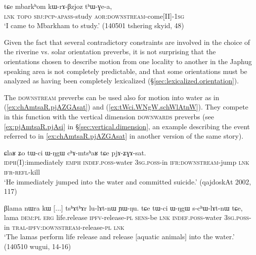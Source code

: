  \begin{exe}
\ex \label{ex:kWrABzjoz.thWGea}
\gll tɕe mbarkʰom kɯ-rɤ-βzjoz tʰɯ-ɣe-a, \\
\textsc{lnk}  \textsc{topo} \textsc{sbj}:\textsc{pcp}-\textsc{apass}-study \textsc{aor}:\textsc{downstream}-come[II]-\textsc{1sg} \\
\glt `I came to Mbarkham to study.' (140501 tshering skyid, 48)
\end{exe}
 
Given the fact that several contradictory constraints are involved in the choice of the riverine vs. solar orientation preverbs, it is not surprising that the orientations chosen to describe motion from one locality to another in the Japhug speaking area is not completely predictable, and that some orientations must be analyzed as having been completely lexicalized (§\ref{sec:lexicalized.orientation}).

The \textsc{downstream} preverbs can be used also for motion into water as in (\ref{ex:chAmtsaR.pjAZGAsat}) and (\ref{ex:tWci.WNgW.schWlAtnW}). They compete in this function with the vertical dimension \textsc{downwards} preverbs (see \ref{ex:pjAmtsaR.pjAsi} in §\ref{sec:vertical.dimension}, an example describing the event referred to in \ref{ex:chAmtsaR.pjAZGAsat} in another version of the same story).
 
 \begin{exe}
\ex \label{ex:chAmtsaR.pjAZGAsat}
\gll ɕlaʁ ʑo tɯ-ci ɯ-ŋgɯ cʰɤ-mtsʰaʁ tɕe pjɤ-ʑɣɤ-sat. \\
\textsc{idph}(I):immediately \textsc{emph} \textsc{indef}.\textsc{poss}-water \textsc{3sg}.\textsc{poss}-in \textsc{ifr}:\textsc{downstream}-jump \textsc{lnk} \textsc{ifr}-\textsc{refl}-kill \\
\glt `He immediately jumped into the water and committed suicide.' (qajdoskAt 2002, 117)
\end{exe}

\begin{exe}
\ex \label{ex:tWci.WNgW.schWlAtnW}
\gll  βlama nɯra kɯ [...] tsʰɤtʰɤr lu-lɤt-nɯ ɲɯ-ŋu.  tɕe tɯ-ci ɯ-ŋgɯ s-cʰɯ-lɤt-nɯ tɕe,  \\
 lama \textsc{dem}:\textsc{pl} \textsc{erg} { } life.release \textsc{ipfv}-release-\textsc{pl} \textsc{sens}-be \textsc{lnk} \textsc{indef}.\textsc{poss}-water \textsc{3sg}.\textsc{poss}-in \textsc{tral}-\textsc{ipfv}:\textsc{downstream}-release-\textsc{pl} \textsc{lnk}  \\
\glt `The lamas perform life release and release [aquatic animals] into the water.' (140510 wugui, 14-16)
\end{exe}

